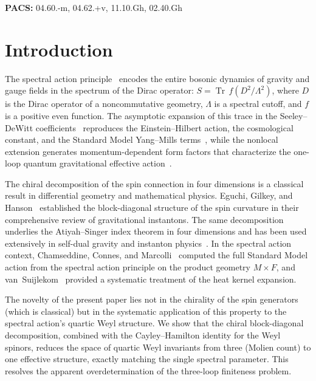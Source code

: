 \documentclass[12pt,a4paper]{article}
\theoremstyle{definition}
\theoremstyle{remark}
\newcommand{\Tr}{\operatorname{Tr}}
\newcommand{\Lam}{\Lambda}
\begin{document}
\noindent\textbf{PACS:} 04.60.-m, 04.62.+v, 11.10.Gh, 02.40.Gh

\tableofcontents
\newpage


\section{Introduction}
\label{sec:intro}

The spectral action principle~\cite{Chamseddine:1996zu,Chamseddine:2006ep}
encodes the entire bosonic dynamics of gravity and gauge fields in the
spectrum of the Dirac operator: $S = \Tr\, f(D^2/\Lam^2)$, where $D$ is the
Dirac operator of a noncommutative geometry, $\Lam$ is a spectral cutoff, and
$f$ is a positive even function.  The asymptotic expansion of this trace in
the Seeley--DeWitt coefficients~\cite{DeWitt:1964mxt,Gilkey:1975iq,%
Vassilevich:2003xt} reproduces the Einstein--Hilbert action, the cosmological
constant, and the Standard Model Yang--Mills
terms~\cite{Chamseddine:2010ud,vanSuijlekom:2014pya}, while the nonlocal
extension generates momentum-dependent form factors that characterize the
one-loop quantum gravitational effective
action~\cite{Barvinsky:1985an,Barvinsky:1987uw,Codello:2012kq}.

The chiral decomposition of the spin connection in four dimensions is
a classical result in differential geometry and mathematical physics.
Eguchi, Gilkey, and Hanson~\cite{EguchiGilkeyHanson:1980} established
the block-diagonal structure of the spin curvature in their comprehensive
review of gravitational instantons.  The same decomposition underlies
the Atiyah--Singer index theorem in four dimensions and has been used
extensively in self-dual gravity and instanton
physics~\cite{AtiyahSinger:1968,AlvarezGaume:1983ig}.  In the spectral
action context, Chamseddine, Connes, and
Marcolli~\cite{ChamseddineConnesMarcolli:2007} computed the full Standard
Model action from the spectral action principle on the product geometry
$M \times F$, and van~Suijlekom~\cite{vanSuijlekom:2014pya} provided a
systematic treatment of the heat kernel expansion.

The novelty of the present paper lies not in the chirality of the spin
generators (which is classical) but in the systematic application of this
property to the spectral action's quartic Weyl structure.  We show that the
chiral block-diagonal decomposition, combined with the Cayley--Hamilton
identity for the Weyl spinors, reduces the space of quartic Weyl invariants
from three (Molien count) to one effective structure, exactly matching the
single spectral parameter.  This resolves the apparent overdetermination of
the three-loop finiteness problem.
\end{document}
